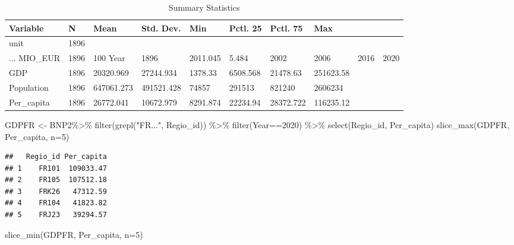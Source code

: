 \documentclass[
]{article}
\newenvironment{Shaded}{\begin{snugshade}}{\end{snugshade}}
\newcommand{\AttributeTok}[1]{\textcolor[rgb]{0.77,0.63,0.00}{#1}}
\newcommand{\DecValTok}[1]{\textcolor[rgb]{0.00,0.00,0.81}{#1}}
\newcommand{\FunctionTok}[1]{\textcolor[rgb]{0.00,0.00,0.00}{#1}}
\newcommand{\NormalTok}[1]{#1}
\newcommand{\OtherTok}[1]{\textcolor[rgb]{0.56,0.35,0.01}{#1}}
\newcommand{\SpecialCharTok}[1]{\textcolor[rgb]{0.00,0.00,0.00}{#1}}
\newcommand{\StringTok}[1]{\textcolor[rgb]{0.31,0.60,0.02}{#1}}
\begin{document}
\begin{table}

\caption{\label{tab:unnamed-chunk-6}Summary Statistics}
\centering
\begin{tabular}[t]{llllllll}
\toprule
Variable & N & Mean & Std. Dev. & Min & Pctl. 25 & Pctl. 75 & Max\\
\midrule
unit & 1896 &  &  &  &  &  & \\
... MIO_EUR & 1896 & 100%
Year & 1896 & 2011.045 & 5.484 & 2002 & 2006 & 2016 & 2020\\
GDP & 1896 & 20320.969 & 27244.934 & 1378.33 & 6508.568 & 21478.63 & 251623.58\\
Population & 1896 & 647061.273 & 491521.428 & 74857 & 291513 & 821240 & 2606234\\
\addlinespace
Per_capita & 1896 & 26772.041 & 10672.979 & 8291.874 & 22234.94 & 28372.722 & 116235.12\\
\bottomrule
\end{tabular}
\end{table}

\begin{Shaded}
\begin{Highlighting}[]
\NormalTok{GDPFR }\OtherTok{\textless{}{-}}\NormalTok{ BNP2}\SpecialCharTok{\%\textgreater{}\%}
  \FunctionTok{filter}\NormalTok{(}\FunctionTok{grepl}\NormalTok{(}\StringTok{"FR..."}\NormalTok{, Regio\_id)) }\SpecialCharTok{\%\textgreater{}\%}
  \FunctionTok{filter}\NormalTok{(Year}\SpecialCharTok{==}\DecValTok{2020}\NormalTok{) }\SpecialCharTok{\%\textgreater{}\%}
  \FunctionTok{select}\NormalTok{(Regio\_id, Per\_capita)}
\FunctionTok{slice\_max}\NormalTok{(GDPFR, Per\_capita, }\AttributeTok{n=}\DecValTok{5}\NormalTok{)}
\end{Highlighting}
\end{Shaded}

\begin{verbatim}
##   Regio_id Per_capita
## 1    FR101  109033.47
## 2    FR105  107512.18
## 3    FRK26   47312.59
## 4    FR104   41823.82
## 5    FRJ23   39294.57
\end{verbatim}

\begin{Shaded}
\begin{Highlighting}[]
\FunctionTok{slice\_min}\NormalTok{(GDPFR, Per\_capita, }\AttributeTok{n=}\DecValTok{5}\NormalTok{)}
\end{Highlighting}
\end{Shaded}
\end{document}
